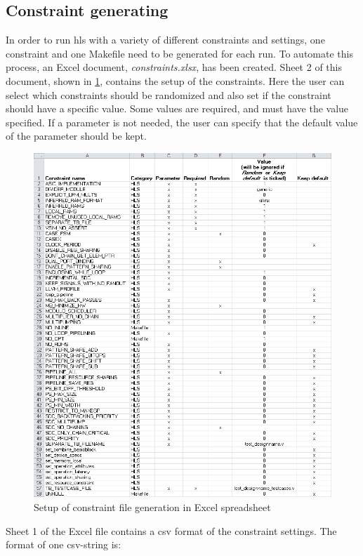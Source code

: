 \subsection{Constraint generating}
In order to run \gls{hls} with a variety of different constraints and settings, one constraint and one Makefile need to be generated for each run. To automate this process, an Excel document, \textit{constraints.xlsx}, has been created. Sheet 2 of this document, shown in \cref{fig:excelconstraintssetup}, contains the setup of the constraints. Here the user can select which constraints should be randomized and also set if the constraint should have a specific value. Some values are required, and must have the value specified. If a parameter is not needed, the user can specify that the default value of the parameter should be kept. 
\begin{figure}[hbpt]
\centering
\includegraphics[width=\textwidth]{../figs/ConstraintGenerationSetup.png}
\caption{\label{fig:excelconstraintssetup}Setup of constraint file generation in Excel spreadsheet}
\end{figure}
Sheet 1 of the Excel file contains a \gls{csv} format of the constraint settings. The format of one \gls{csv}-string is:
